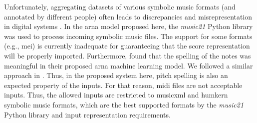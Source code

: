 
Unfortunately, aggregating datasets of various symbolic
music formats (and annotated by different people) often
leads to discrepancies and misrepresentation in digital
systems \parencite{napoleslopez2018encoding,
napoleslopez2019effects}. In the \gls{arna} model proposed
here, the \emph{music21} Python library
\parencite{cuthbert2010music21} was used to process incoming
symbolic music files. The support for some formats (e.g.,
\gls{mei}) is currently inadequate for guaranteeing that the
score representation will be properly imported. Furthermore,
\textcite{micchi2020not} found that the spelling of the
notes was meaningful in their proposed \gls{arna} machine
learning model. We followed a similar approach in
\textcite{napoleslopez2021augmentednet}. Thus, in the
proposed system here, pitch spelling is also an expected
property of the inputs. For that reason, \gls{midi} files
are not acceptable inputs. Thus, the allowed inputs are
restricted to \gls{musicxml} and \gls{humkern} symbolic
music formats, which are the best supported formats by the
\emph{music21} Python library and input representation
requirements.
